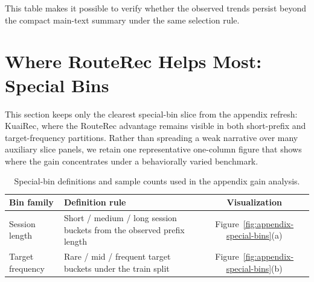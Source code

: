 \documentclass[sigconf,review,anonymous]{acmart}
\begin{document}
This table makes it possible to verify whether the observed trends persist beyond the compact main-text summary under the same selection rule.

\FloatBarrier

\section{Where RouteRec Helps Most: Special Bins}
\label{app:special-bins}
This section keeps only the clearest special-bin slice from the appendix refresh: KuaiRec, where the RouteRec advantage remains visible in both short-prefix and target-frequency partitions. Rather than spreading a weak narrative over many auxiliary slice panels, we retain one representative one-column figure that shows where the gain concentrates under a behaviorally varied benchmark.

\begin{table}[H]
  \centering
  \caption{Special-bin definitions and sample counts used in the appendix gain analysis.}
  \label{tab:appendix-special-bins}
  \scriptsize
  \setlength{\tabcolsep}{4pt}
  \begin{tabularx}{\columnwidth}{@{}l>{\raggedright\arraybackslash}Xc@{}}
    \toprule
    Bin family & Definition rule & Visualization \\
    \midrule
    Session length & Short / medium / long session buckets from the observed prefix length & Figure~\ref{fig:appendix-special-bins}(a) \\
    Target frequency & Rare / mid / frequent target buckets under the train split & Figure~\ref{fig:appendix-special-bins}(b) \\
    \bottomrule
  \end{tabularx}
\end{table}
\end{document}
